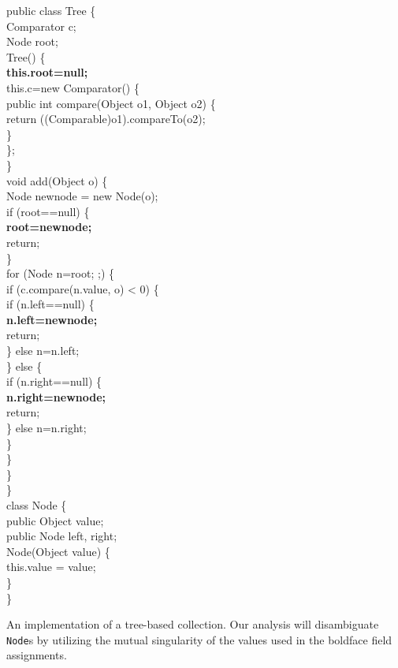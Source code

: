 \documentclass[11pt,notitlepage]{article}
\begin{document}
\begin{myfigure}\small
\begin{samplecode}
public class Tree \{\\
\>Comparator c;\\
\>Node root;\\
\>Tree() \{\\
\>\>\textbf{this.root=null;}\\
\>\>this.c=new Comparator() \{\\
\>\>\>public int compare(Object o1, Object o2) \{\\
\>\>\>\>return ((Comparable)o1).compareTo(o2);\\
\>\>\>\}\\
\>\>\};\\
\>\}\\
\>void add(Object o) \{\\
\>\>Node newnode = new Node(o);\\
\>\>if (root==null) \{\\
\>\>\>\textbf{root=newnode;}\\
\>\>\>return;\\
\>\>\}\\
\>\>for (Node n=root; ;) \{\\
\>\>\>if (c.compare(n.value, o) < 0) \{\\
\>\>\>\>if (n.left==null) \{\\
\>\>\>\>\>\textbf{n.left=newnode;}\\
\>\>\>\>\>return;\\
\>\>\>\>\} else n=n.left;\\
\>\>\>\} else \{\\
\>\>\>\>if (n.right==null) \{\\
\>\>\>\>\>\textbf{n.right=newnode;}\\
\>\>\>\>\>return;\\
\>\>\>\>\} else n=n.right;\\
\>\>\>\}\\
\>\>\}\\
\>\}\\
\}\\
class Node \{\\
\>public Object value;\\
\>public Node left, right;\\
\>Node(Object value) \{\\
\>\>this.value = value;\\
\>\}\\
\}\\
\end{samplecode}
\caption{An implementation of a tree-based collection.  Our analysis
  will disambiguate \texttt{Node}s by utilizing the mutual singularity
  of the values used in the boldface field assignments.}
\label{fig:tree}
\end{myfigure}
\end{document}
